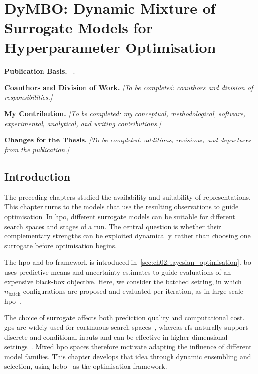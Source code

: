 \chapter{DyMBO: Dynamic Mixture of Surrogate Models for Hyperparameter Optimisation}\label{ch:ch06:dymbo}

\begingroup\small
\noindent\textbf{Publication Basis.} ~\citep{ShaEtAl25d}.\par
\noindent\textbf{Coauthors and Division of Work.} \emph{[To be completed: coauthors and division of responsibilities.]}\par
\noindent\textbf{My Contribution.} \emph{[To be completed: my conceptual, methodological, software, experimental, analytical, and writing contributions.]}\par
\noindent\textbf{Changes for the Thesis.} \emph{[To be completed: additions, revisions, and departures from the publication.]}\par
\endgroup\medskip

\section{Introduction}
\label{sec:ch06:intro}
The preceding chapters studied the availability and suitability of representations. This chapter turns to the models that use the resulting observations to guide optimisation. In \gls{hpo}, different surrogate models can be suitable for different search spaces and stages of a run. The central question is whether their complementary strengths can be exploited dynamically, rather than choosing one surrogate before optimisation begins.

The \gls{hpo} and \Gls{bo} framework is introduced in~\cref{sec:ch02:bayesian_optimisation}. \gls{bo} uses predictive means and uncertainty estimates to guide evaluations of an expensive black-box objective. Here, we consider the batched setting, in which $n_{\mathrm{batch}}$ configurations are proposed and evaluated per iteration, as in large-scale \gls{hpo}~\citep{CowEtAl22,BisEtAl23}.

The choice of surrogate affects both prediction quality and computational cost. \Glspl{gp} are widely used for continuous search spaces~\citep{RasWil06,EggEtAl13,EggEtAl21,BenEtAl25}, whereas \glspl{rf} naturally support discrete and conditional inputs and can be effective in higher-dimensional settings~\citep{Breiman01,EggEtAl13,JenEtAl17,LiEtAl18}. Mixed \gls{hpo} spaces therefore motivate adapting the influence of different model families. This chapter develops that idea through dynamic ensembling and selection, using \gls{hebo}~\citep{CowEtAl22} as the optimisation framework.

